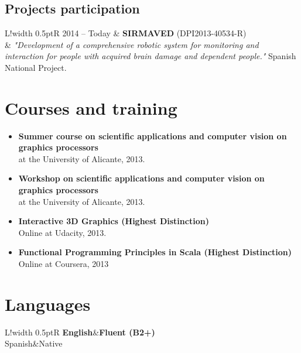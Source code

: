 \documentclass[8pt]{article}
\newcommand\VRule{\color{lightgray}\vrule width 0.5pt}
\begin{document}
\subsection*{Projects participation}

\begin{tabular}{L!{\VRule}R}
2014 -- Today & \textbf{SIRMAVED} (DPI2013-40534-R)\\
& \textit{"Development of a comprehensive robotic system for monitoring and interaction for people with acquired brain damage and dependent people."} Spanish National Project. \\
\end{tabular}

\section*{Courses and training}

\begin{itemize}
	\item \textbf{Summer course on scientific applications and computer vision on graphics processors}\\ at the University of Alicante, 2013.
	\item \textbf{Workshop on scientific applications and computer vision on graphics processors}\\ at the University of Alicante, 2013.	
	\item \textbf{Interactive 3D Graphics (Highest Distinction)}\\
	Online at Udacity, 2013.
	\item \textbf{Functional Programming Principles in Scala (Highest Distinction)}\\
	Online at Coursera, 2013
\end{itemize}

\section*{Languages}
\begin{tabular}{L!{\VRule}R}
{\bf English}&{\bf Fluent (B2+)}\\
{Spanish}&{Native}\\
\end{tabular}

 
\end{document}
